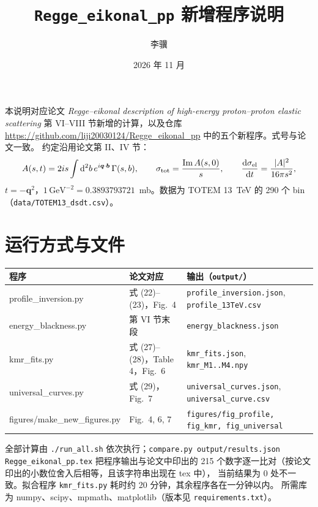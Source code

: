 \documentclass[11pt,a4paper]{ctexart}
\title{\texttt{Regge\_eikonal\_pp} 新增程序说明}
\author{李骥}
\date{2026 年 11 月}
\newcommand{\dd}{\mathrm d}
\newcommand{\GeVm}{\,\mathrm{GeV}^{-2}}
\begin{document}
\maketitle

本说明对应论文 \emph{Regge--eikonal description of high-energy proton--proton elastic scattering} 第
VI--VIII 节新增的计算，以及仓库 \url{https://github.com/liji20030124/Regge_eikonal_pp} 中的五个新程序。式号与论文一致。
约定沿用论文第 II、IV 节：
\begin{equation}
A(s,t)=2is\int\dd^2b\,e^{i\bm q\cdot\bm b}\,\Gamma(s,b),\qquad
\sigma_{\rm tot}=\frac{{\rm Im}\,A(s,0)}{s},\qquad
\frac{\dd\sigma_{\rm el}}{\dd t}=\frac{|A|^2}{16\pi s^2},
\label{eq:conv}
\end{equation}
$t=-\bm q^2$，$1\GeVm=0.3893793721$~mb。数据为 TOTEM 13~TeV 的 290 个 bin（\texttt{data/TOTEM13\_dsdt.csv}）。

\section{运行方式与文件}

\begin{center}\small
\begin{tabular}{>{\ttfamily}l l l}
\toprule
\normalfont 程序 & 论文对应 & 输出（\texttt{output/}） \\
\midrule
profile\_inversion.py & 式 (22)--(23)，Fig.~4 & \texttt{profile\_inversion.json}, \texttt{profile\_13TeV.csv}\\
energy\_blackness.py & 第 VI 节末段 & \texttt{energy\_blackness.json}\\
kmr\_fits.py & 式 (27)--(28)，Table 4，Fig.~6 & \texttt{kmr\_fits.json}, \texttt{kmr\_M1..M4.npy}\\
universal\_curves.py & 式 (29)，Fig.~7 & \texttt{universal\_curves.json}, \texttt{universal\_curve.csv}\\
figures/make\_new\_figures.py & Fig.~4, 6, 7 & \texttt{figures/fig\_profile, fig\_kmr, fig\_universal}\\
\bottomrule
\end{tabular}
\end{center}

全部计算由 \texttt{./run\_all.sh} 依次执行；\texttt{compare.py output/results.json Regge\_eikonal\_pp.tex}
把程序输出与论文中印出的 215 个数字逐一比对（按论文印出的小数位舍入后相等，且该字符串出现在 tex 中），
当前结果为 0 处不一致。拟合程序 \texttt{kmr\_fits.py} 耗时约 20 分钟，其余程序各在一分钟以内。
所需库为 numpy、scipy、mpmath、matplotlib（版本见 \texttt{requirements.txt}）。
\end{document}
